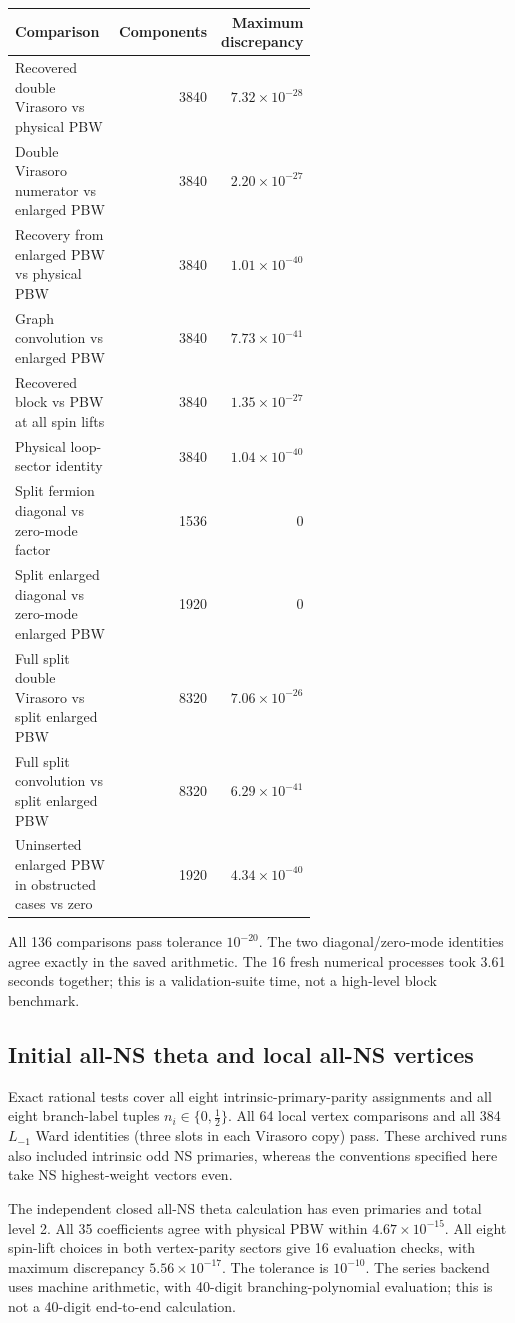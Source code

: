 \documentclass[11pt]{article}
\numberwithin{equation}{section}
\begin{document}
{\small
\begin{longtable}{@{}p{0.60\linewidth}rr@{}}
\toprule
Comparison & Components & Maximum discrepancy\\
\midrule
\endhead
Recovered double Virasoro vs physical PBW & 3840 & $7.32\times10^{-28}$\\
Double Virasoro numerator vs enlarged PBW & 3840 & $2.20\times10^{-27}$\\
Recovery from enlarged PBW vs physical PBW & 3840 & $1.01\times10^{-40}$\\
Graph convolution vs enlarged PBW & 3840 & $7.73\times10^{-41}$\\
Recovered block vs PBW at all spin lifts & 3840 & $1.35\times10^{-27}$\\
Physical loop-sector identity & 3840 & $1.04\times10^{-40}$\\
Split fermion diagonal vs zero-mode factor & 1536 & $0$\\
Split enlarged diagonal vs zero-mode enlarged PBW & 1920 & $0$\\
Full split double Virasoro vs split enlarged PBW & 8320 & $7.06\times10^{-26}$\\
Full split convolution vs split enlarged PBW & 8320 & $6.29\times10^{-41}$\\
Uninserted enlarged PBW in obstructed cases vs zero & 1920 & $4.34\times10^{-40}$\\
\bottomrule
\end{longtable}}
All 136 comparisons pass tolerance $10^{-20}$. The two diagonal/zero-mode
identities agree exactly in the saved arithmetic. The 16 fresh numerical
processes took 3.61 seconds together; this is a validation-suite time,
not a high-level block benchmark.

\subsection{Initial all-NS theta and local all-NS vertices}

Exact rational tests cover all eight intrinsic-primary-parity assignments
and all eight branch-label tuples $n_i\in\{0,\frac12\}$. All 64 local
vertex comparisons and all 384 $L_{-1}$ Ward identities (three slots in
each Virasoro copy) pass. These archived runs also included intrinsic odd NS primaries, whereas
the conventions specified here take NS highest-weight vectors even.

The independent closed all-NS theta calculation has even primaries and
total level 2. All 35 coefficients agree with physical PBW within
$4.67\times10^{-15}$. All eight spin-lift choices in both vertex-parity
sectors give 16 evaluation checks, with maximum discrepancy
$5.56\times10^{-17}$. The tolerance is $10^{-10}$. The series backend
uses machine arithmetic, with 40-digit branching-polynomial evaluation;
this is not a 40-digit end-to-end calculation.
\end{document}
